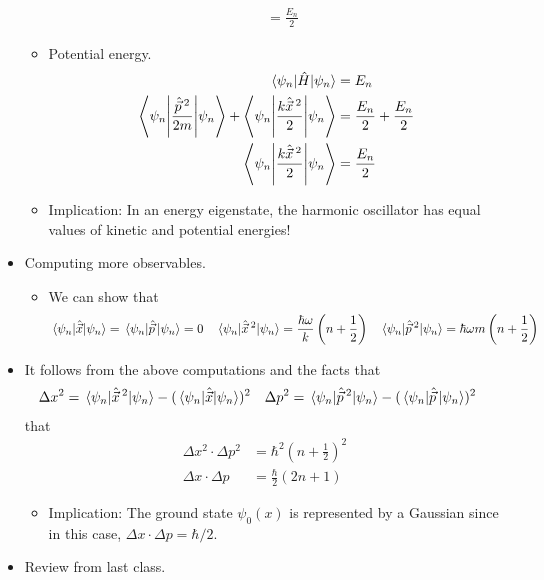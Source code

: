 \documentclass[../notes.tex]{subfiles}
\begin{document}
\begin{itemize}
\begin{itemize}
\begin{align*}
            &= \frac{E_n}{2}
        \end{align*}
        \item Potential energy.
        \begin{align*}
            \ev{\hat{H}}{\psi_n} &= E_n\\
            \ev**{\frac{\hat{\vec{p}}{\,}^2}{2m}}{\psi_n}+\ev**{\frac{k\hat{\vec{x}}{\,}^2}{2}}{\psi_n} &= \frac{E_n}{2}+\frac{E_n}{2}\\
            \ev**{\frac{k\hat{\vec{x}}{\,}^2}{2}}{\psi_n} &= \frac{E_n}{2}
        \end{align*}
        \item Implication: In an energy eigenstate, the harmonic oscillator has equal values of kinetic and potential energies!
    \end{itemize}
    \pagebreak
    \item Computing more observables.
    \begin{itemize}
        \item We can show that
        \begin{align*}
            \ev{\hat{\vec{x}}}{\psi_n} &= \ev{\hat{\vec{p}}\,}{\psi_n} = 0&
            \ev{\hat{\vec{x}}{\,}^2}{\psi_n} &= \frac{\hbar\omega}{k}\left( n+\frac{1}{2} \right)&
            \ev{\hat{\vec{p}}{\,}^2}{\psi_n} &= \hbar\omega m\left( n+\frac{1}{2} \right)
        \end{align*}
    \end{itemize}
    \item It follows from the above computations and the facts that
    \begin{align*}
        \Delta x^2 &= \ev{\hat{\vec{x}}{\,}^2}{\psi_n}-(\ev{\hat{\vec{x}}}{\psi_n})^2&
        \Delta p^2 &= \ev{\hat{\vec{p}}{\,}^2}{\psi_n}-(\ev{\hat{\vec{p}}\,}{\psi_n})^2
    \end{align*}
    that
    \begin{align*}
        \Delta x^2\cdot\Delta p^2 &= \hbar^2\left( n+\frac{1}{2} \right)^2\\
        \Delta x\cdot\Delta p &= \frac{\hbar}{2}(2n+1)
    \end{align*}
    \begin{itemize}
        \item Implication: The ground state $\psi_0(x)$ is represented by a Gaussian since in this case, $\Delta x\cdot\Delta p=\hbar/2$.
    \end{itemize}
    \item Review from last class.
    \begin{itemize}

\end{itemize}
\end{itemize}
\end{document}
